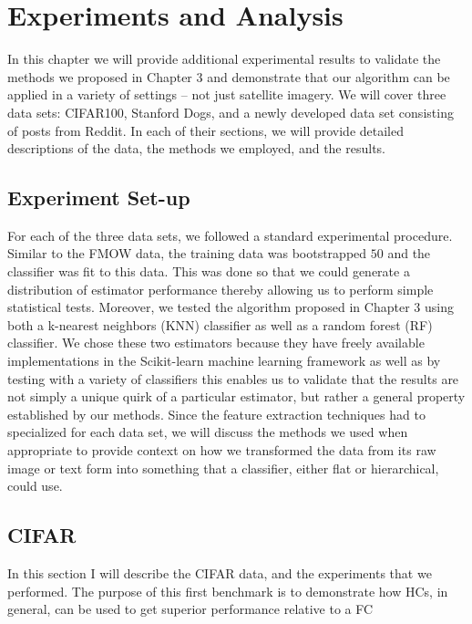 \documentclass[../thesis.tex]{subfiles}
\begin{document}
\chapter{Experiments and Analysis}
In this chapter we will provide additional experimental results to validate the
methods we proposed in Chapter 3 and demonstrate that our algorithm can be
applied in a variety of settings -- not just satellite imagery. We will cover
three data sets: CIFAR100, Stanford Dogs, and a newly developed data set
consisting of posts from Reddit. In each of their sections, we will provide
detailed descriptions of the data, the methods we employed, and the results.

\section{Experiment Set-up}
For each of the three data sets, we followed a standard experimental procedure.
Similar to the FMOW data, the training data was bootstrapped $50$ and the
classifier was fit to this data. This was done so that we could generate a
distribution of estimator performance thereby allowing us to perform simple
statistical tests. Moreover, we tested the algorithm proposed in Chapter 3 using
both a k-nearest neighbors (KNN) classifier as well as a random forest (RF)
classifier. We chose these two estimators because they have freely available
implementations in the Scikit-learn machine learning framework as well as by
testing with a variety of classifiers this enables us to validate that the
results are not simply a unique quirk of a particular estimator, but rather a
general property established by our methods. Since the feature extraction
techniques had to specialized for each data set, we will discuss the methods we
used when appropriate to provide context on how we transformed the data from its
raw image or text form into something that a classifier, either flat or
hierarchical, could use.

\section{CIFAR}

In this section I will describe the CIFAR data, and the experiments that we
performed. The purpose of this first benchmark is to demonstrate how HCs, in
general, can be used to get superior performance relative to a FC
\end{document}
